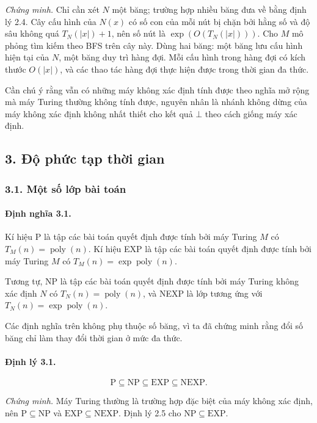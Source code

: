 \documentclass[11pt]{article}
\begin{document}
\emph{Chứng minh.}
Chỉ cần xét \(N\) một băng; trường hợp nhiều băng đưa về bằng định lý 2.4. Cây
cấu hình của \(N(x)\) có số con của mỗi nút bị chặn bởi hằng số và độ sâu không
quá \(T_N(|x|)+1\), nên số nút là \(\exp(O(T_N(|x|)))\). Cho \(M\) mô phỏng tìm
kiếm theo BFS trên cây này. Dùng hai băng: một băng lưu cấu hình hiện tại của
\(N\), một băng duy trì hàng đợi. Mỗi cấu hình trong hàng đợi có kích thước
\(O(|x|)\), và các thao tác hàng đợi thực hiện được trong thời gian đa thức.

Cần chú ý rằng vẫn có những máy không xác định tính được theo nghĩa mở rộng mà
máy Turing thường không tính được, nguyên nhân là nhánh không dừng của máy không
xác định không nhất thiết cho kết quả \(\bot\) theo cách giống máy xác định.

\subsection*{3. Độ phức tạp thời gian}

\subsubsection*{3.1. Một số lớp bài toán}

\paragraph{Định nghĩa 3.1.}
Kí hiệu P là tập các bài toán quyết định được tính bởi máy Turing \(M\) có
\(T_M(n)=\operatorname{poly}(n)\). Kí hiệu EXP là tập các bài toán quyết định
được tính bởi máy Turing \(M\) có \(T_M(n)=\exp\operatorname{poly}(n)\).

Tương tự, NP là tập các bài toán quyết định được tính bởi máy Turing không xác
định \(N\) có \(T_N(n)=\operatorname{poly}(n)\), và NEXP là lớp tương ứng với
\(T_N(n)=\exp\operatorname{poly}(n)\).

Các định nghĩa trên không phụ thuộc số băng, vì ta đã chứng minh rằng đổi số
băng chỉ làm thay đổi thời gian ở mức đa thức.

\paragraph{Định lý 3.1.}
\[
  \mathrm P\subseteq \mathrm{NP}\subseteq \mathrm{EXP}\subseteq \mathrm{NEXP}.
\]

\emph{Chứng minh.}
Máy Turing thường là trường hợp đặc biệt của máy không xác định, nên
\(\mathrm P\subseteq\mathrm{NP}\) và \(\mathrm{EXP}\subseteq\mathrm{NEXP}\).
Định lý 2.5 cho \(\mathrm{NP}\subseteq\mathrm{EXP}\).
\end{document}
